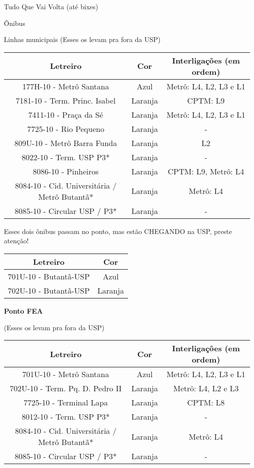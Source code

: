 \begin{secao}{Tudo Que Vai Volta (até bixes)}
\begin{subsecao}{Ônibus}
\begin{subsubsecao}{Linhas municipais}
(Esses os levam pra fora da USP)
\begin{center}
	\begin{tabular}{|c|c|c|}
      \hline
	  Letreiro & Cor & Interligações (em ordem)\\
	  \hline
	  177H-10 - Metrô Santana & Azul & Metrô: L4, L2, L3 e L1\\
	  7181-10 - Term. Princ. Isabel & Laranja & CPTM: L9\\
	  7411-10 - Praça da Sé & Laranja & Metrô: L4, L2, L3 e L1\\
	  7725-10 - Rio Pequeno & Laranja & - \\
	  809U-10 - Metrô Barra Funda & Laranja & L2 \\
	  8022-10 - Term. USP P3* & Laranja & -\\
   	8086-10 - Pinheiros & Laranja & CPTM: L9, Metrô: L4 \\
   	8084-10 - Cid. Universitária / Metrô Butantã* & Laranja & Metrô: L4\\
    8085-10 - Circular USP / P3* & Laranja & -\\
      \hline
	\end{tabular}
\end{center}

Esses dois ônibus passam no ponto, mas estão CHEGANDO na USP, preste 
atenção!

\begin{center}
	\begin{tabular}{|c|c|}
	  \hline
	  Letreiro & Cor\\
	  \hline
	  701U-10 - Butantã-USP & Azul\\
	  702U-10 - Butantã-USP & Laranja\\
	  \hline
	\end{tabular}
\end{center}

{\bf Ponto FEA}

(Esses os levam pra fora da USP)
\begin{center}
	\begin{tabular}{|c|c|c|}
      \hline
	  Letreiro & Cor & Interligações (em ordem)\\
	  \hline
	  701U-10 - Metrô Santana & Azul & Metrô: L4, L2, L3 e L1\\
	  702U-10 - Term. Pq. D. Pedro II & Laranja & Metrô: L4, L2 e L3\\
	  7725-10 - Terminal Lapa & Laranja & CPTM: L8\\
	  8012-10 - Term. USP P3* & Laranja & -\\
	  8084-10 - Cid. Universitária / Metrô Butantã* & Laranja & Metrô: L4\\
    8085-10 - Circular USP / P3* & Laranja & -\\


\end{tabular}
\end{center}
\end{subsubsecao}
\end{subsecao}
\end{secao}
